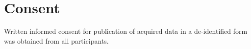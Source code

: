 \section*{Consent}

Written informed consent for publication of acquired data in a de-identified form was obtained from
all participants.
